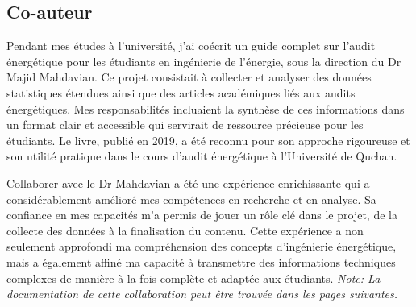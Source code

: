 \documentclass{article}
\begin{document}
    \subsection{Co-auteur}

    Pendant mes études à l'université, j'ai coécrit un guide complet sur l'audit énergétique pour les étudiants en ingénierie de l'énergie, sous la direction du Dr Majid Mahdavian. Ce projet consistait à collecter et analyser des données statistiques étendues ainsi que des articles académiques liés aux audits énergétiques. Mes responsabilités incluaient la synthèse de ces informations dans un format clair et accessible qui servirait de ressource précieuse pour les étudiants. Le livre, publié en 2019, a été reconnu pour son approche rigoureuse et son utilité pratique dans le cours d'audit énergétique à l'Université de Quchan.

    Collaborer avec le Dr Mahdavian a été une expérience enrichissante qui a considérablement amélioré mes compétences en recherche et en analyse. Sa confiance en mes capacités m'a permis de jouer un rôle clé dans le projet, de la collecte des données à la finalisation du contenu. Cette expérience a non seulement approfondi ma compréhension des concepts d'ingénierie énergétique, mais a également affiné ma capacité à transmettre des informations techniques complexes de manière à la fois complète et adaptée aux étudiants.
    \newline
    \newline
    \textit {Note: La documentation de cette collaboration peut être trouvée dans les pages suivantes.}
    \newline
    \newline

    \newpage
\end{document}
